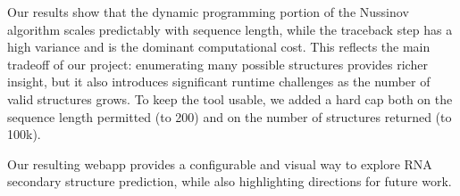 \documentclass[12pt]{article}
\begin{document}
Our results show that the dynamic programming portion of the Nussinov algorithm scales predictably with sequence length, while the traceback step has a high variance and is the dominant computational cost. This reflects the main tradeoff of our project: enumerating many possible structures provides richer insight, but it also introduces significant runtime challenges as the number of valid structures grows. To keep the tool usable, we added a hard cap both on the sequence length permitted (to 200) and on the number of structures returned (to 100k).

Our resulting webapp provides a configurable and visual way to explore RNA secondary structure prediction, while also highlighting directions for future work.
\end{document}
